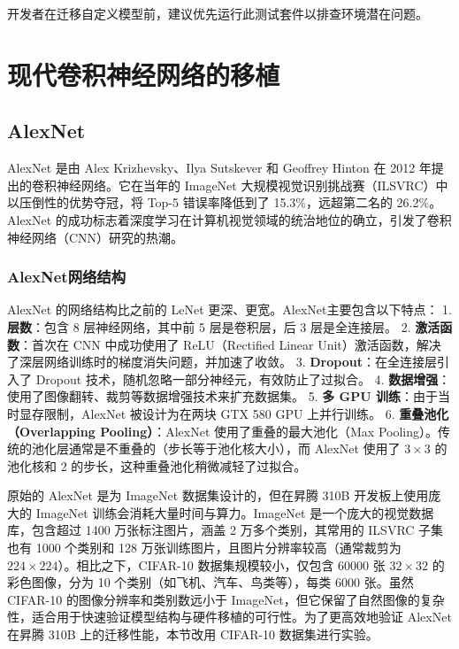 开发者在迁移自定义模型前，建议优先运行此测试套件以排查环境潜在问题。

\section{现代卷积神经网络的移植}\label{src-book-chapter3-h19}

\subsection{AlexNet}\label{src-book-chapter3-h20}

AlexNet 是由 Alex Krizhevsky、Ilya Sutskever 和 Geoffrey Hinton 在 2012
年提出的卷积神经网络。它在当年的 ImageNet
大规模视觉识别挑战赛（ILSVRC）中以压倒性的优势夺冠，将 Top-5
错误率降低到了 15.3\%，远超第二名的 26.2\%。AlexNet
的成功标志着深度学习在计算机视觉领域的统治地位的确立，引发了卷积神经网络（CNN）研究的热潮。

\subsubsection{AlexNet网络结构}\label{src-book-chapter3-h21}

AlexNet 的网络结构比之前的 LeNet 更深、更宽。AlexNet主要包含以下特点：
1. \textbf{层数}：包含 8 层神经网络，其中前 5 层是卷积层，后 3
层是全连接层。 2. \textbf{激活函数}：首次在 CNN 中成功使用了
ReLU（Rectified Linear
Unit）激活函数，解决了深层网络训练时的梯度消失问题，并加速了收敛。 3.
\textbf{Dropout}：在全连接层引入了 Dropout
技术，随机忽略一部分神经元，有效防止了过拟合。 4.
\textbf{数据增强}：使用了图像翻转、裁剪等数据增强技术来扩充数据集。 5.
\textbf{多 GPU 训练}：由于当时显存限制，AlexNet 被设计为在两块 GTX 580
GPU 上并行训练。 6. \textbf{重叠池化（Overlapping Pooling）}：AlexNet
使用了重叠的最大池化（Max
Pooling）。传统的池化层通常是不重叠的（步长等于池化核大小），而 AlexNet
使用了 \(3 \times 3\) 的池化核和 2
的步长，这种重叠池化稍微减轻了过拟合。

原始的 AlexNet 是为 ImageNet 数据集设计的，但在昇腾 310B
开发板上使用庞大的 ImageNet 训练会消耗大量时间与算力。ImageNet
是一个庞大的视觉数据库，包含超过 1400 万张标注图片，涵盖 2
万多个类别，其常用的 ILSVRC 子集也有 1000 个类别和 128
万张训练图片，且图片分辨率较高（通常裁剪为
\(224 \times 224\)）。相比之下，CIFAR-10 数据集规模较小，仅包含 60000 张
\(32 \times 32\) 的彩色图像，分为 10
个类别（如飞机、汽车、鸟类等），每类 6000 张。虽然 CIFAR-10
的图像分辨率和类别数远小于
ImageNet，但它保留了自然图像的复杂性，适合用于快速验证模型结构与硬件移植的可行性。为了更高效地验证
AlexNet 在昇腾 310B 上的迁移性能，本节改用 CIFAR-10 数据集进行实验。

